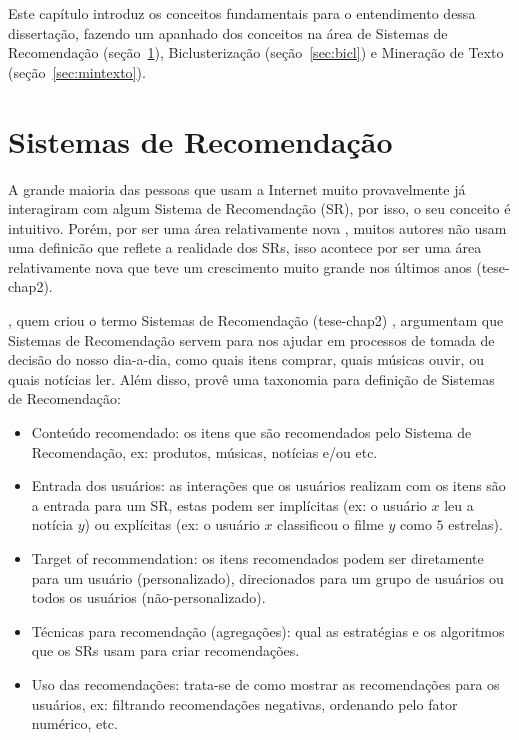 \documentclass[normaltoc, espacoumemeio, pnumromarab,ruledheader]{abnt}
\begin{document}
Este capítulo introduz os conceitos fundamentais para o entendimento dessa dissertação, fazendo um apanhado dos conceitos na área de Sistemas de Recomendação (seção~\ref{sec:sr}), Biclusterização (seção~\ref{sec:bicl}) e Mineração de Texto (seção~\ref{sec:mintexto}).

\section{Sistemas de Recomendação}
\label{sec:sr}

A grande maioria das pessoas que usam a Internet muito provavelmente já interagiram com algum Sistema de Recomendação (SR), por isso, o seu conceito é intuitivo.
Porém, por ser uma área relativamente nova \cite{Lops2011}, muitos autores não usam uma definicão que reflete a realidade dos SRs, isso acontece por ser uma área relativamente nova que teve um crescimento muito grande nos últimos anos (tese-chap2).

, quem criou o termo Sistemas de Recomendação (tese-chap2) \cite{Neumann2007}, argumentam que Sistemas de Recomendação servem para nos ajudar em processos de tomada de decisão do nosso dia-a-dia, como quais itens comprar, quais músicas ouvir, ou quais notícias ler.
Além disso,  provê uma taxonomia para definição de Sistemas de Recomendação:
\begin{itemize}
  \item Conteúdo recomendado: os itens que são recomendados pelo Sistema de Recomendação, ex: produtos, músicas, notícias e/ou etc.
  \item Entrada dos usuários: as interações que os usuários realizam com os itens são a entrada para um SR, estas podem ser implícitas (ex: o usuário $x$ leu a notícia $y$) ou explícitas (ex: o usuário $x$ classificou o filme $y$ como $5$ estrelas).
  \item Target of recommendation: os itens recomendados podem ser diretamente para um usuário (personalizado), direcionados para um grupo de usuários ou todos os usuários (não-personalizado).
  \item Técnicas para recomendação (agregações): qual as estratégias e os algoritmos que os SRs usam para criar recomendações.
  \item Uso das recomendações: trata-se de como mostrar as recomendações para os usuários, ex: filtrando recomendações negativas, ordenando pelo fator numérico, etc.
\end{itemize}
\end{document}
